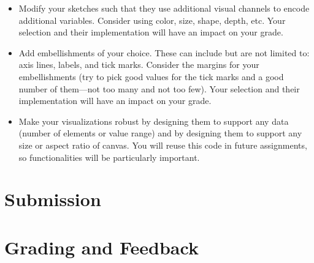 \documentclass[a4paper,12pt]{article}
\begin{document}
\begin{itemize}




\item Modify your sketches such that they use additional visual channels to encode additional variables. Consider using color, size, shape, depth, etc. Your selection and their implementation will have an impact on your grade.

\item Add embellishments of your choice. These can include but are not limited to: axis lines, labels, and tick marks. Consider the margins for your embellishments (try to pick good values for the tick marks and a good number of them---not too many and not too few). Your selection and their implementation will have an impact on your grade.

\item Make your visualizations robust by designing them to support any data (number of elements or value range) and by designing them to support any size or aspect ratio of canvas. You will reuse this code in future assignments, so functionalities will be particularly important.

\end{itemize}


\section{Submission}




\section{Grading and Feedback}
\end{document}
